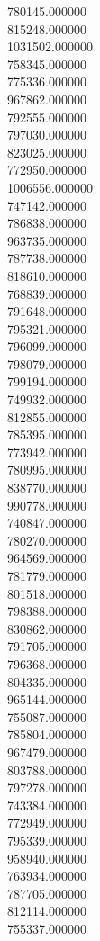 780145.000000\\
815248.000000\\
1031502.000000\\
758345.000000\\
775336.000000\\
967862.000000\\
792555.000000\\
797030.000000\\
823025.000000\\
772950.000000\\
1006556.000000\\
747142.000000\\
786838.000000\\
963735.000000\\
787738.000000\\
818610.000000\\
768839.000000\\
791648.000000\\
795321.000000\\
796099.000000\\
798079.000000\\
799194.000000\\
749932.000000\\
812855.000000\\
785395.000000\\
773942.000000\\
780995.000000\\
838770.000000\\
990778.000000\\
740847.000000\\
780270.000000\\
964569.000000\\
781779.000000\\
801518.000000\\
798388.000000\\
830862.000000\\
791705.000000\\
796368.000000\\
804335.000000\\
965144.000000\\
755087.000000\\
785804.000000\\
967479.000000\\
803788.000000\\
797278.000000\\
743384.000000\\
772949.000000\\
795339.000000\\
958940.000000\\
763934.000000\\
787705.000000\\
812114.000000\\
755337.000000\\
